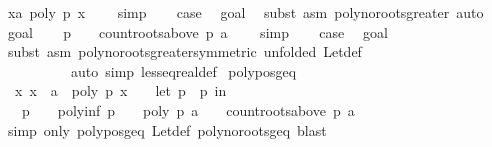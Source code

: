 \begin{isabellebody}
\ {\isachardoublequoteopen}{\isasymforall}x{\isachargreater}a{\isachardot}\ poly\ p\ x\ {\isasymnoteq}\ {}{\isachardoublequoteclose}\ \isamarkupfalse%
\ simp\isanewline
\ \ \isamarkupfalse%
\ {\isacharquery}case\ \isamarkupfalse%
\ goal{}\ \isamarkupfalse%
\ {\isacharparenleft}subst\ {\isacharparenleft}asm{\isacharparenright}\ poly{\isacharunderscore}no{\isacharunderscore}roots{\isacharunderscore}greater{\isacharcomma}\ auto{\isacharparenright}\isanewline
{}\isamarkupfalse%
\isanewline
\ \ \isamarkupfalse%
\ goal{}\isanewline
\ \ \isamarkupfalse%
\ {\isachardoublequoteopen}{\isacharparenleft}p\ {\isasymnoteq}\ {}\ {\isasymand}\ count{\isacharunderscore}roots{\isacharunderscore}above\ p\ a\ {\isacharequal}\ {}{\isacharparenright}{\isachardoublequoteclose}\ \isamarkupfalse%
\ simp\isanewline
\ \ \isamarkupfalse%
\ {\isacharquery}case\ \isamarkupfalse%
\ goal{}\ \isanewline
\ \ \ \ \ \ \isamarkupfalse%
\ {\isacharparenleft}subst\ {\isacharparenleft}asm{\isacharparenright}\ poly{\isacharunderscore}no{\isacharunderscore}roots{\isacharunderscore}greater{\isacharbrackleft}symmetric{\isacharcomma}\ unfolded\ Let{\isacharunderscore}def{\isacharbrackright}{\isacharcomma}\ \isanewline
\ \ \ \ \ \ \ \ \ \ auto\ simp{\isacharcolon}\ less{\isacharunderscore}eq{\isacharunderscore}real{\isacharunderscore}def{\isacharparenright}\isanewline
{}\isamarkupfalse%
%
\endisatagproof
{\isafoldproof}%
%
\isadelimproof
\isanewline
%
\endisadelimproof
\isanewline
{}\isamarkupfalse%
\ poly{\isacharunderscore}pos{\isacharunderscore}geq{\isacharcolon}\isanewline
\ \ {\isachardoublequoteopen}{\isacharparenleft}{\isasymforall}x{\isachardot}\ x\ {\isasymge}\ a\ {\isasymlongrightarrow}\ poly\ p\ x\ {\isachargreater}\ {}{\isacharparenright}\ {\isasymlongleftrightarrow}\ {\isacharparenleft}let\ p\ {\isacharequal}\ p\ in\isanewline
\ \ \ p\ {\isasymnoteq}\ {}\ {\isasymand}\ poly{\isacharunderscore}inf\ p\ {\isacharequal}\ {}\ {\isasymand}\ poly\ p\ a\ {\isasymnoteq}\ {}\ {\isasymand}\ count{\isacharunderscore}roots{\isacharunderscore}above\ p\ a\ {\isacharequal}\ {}{\isacharparenright}{\isachardoublequoteclose}\isanewline
%
\isadelimproof
\ \ %
\endisadelimproof
%
\isatagproof
{}\isamarkupfalse%
\ {\isacharparenleft}simp\ only{\isacharcolon}\ poly{\isacharunderscore}pos{\isacharunderscore}geq\ Let{\isacharunderscore}def\ poly{\isacharunderscore}no{\isacharunderscore}roots{\isacharunderscore}geq{\isacharcomma}\ blast{\isacharparenright}%

\end{isabellebody}

